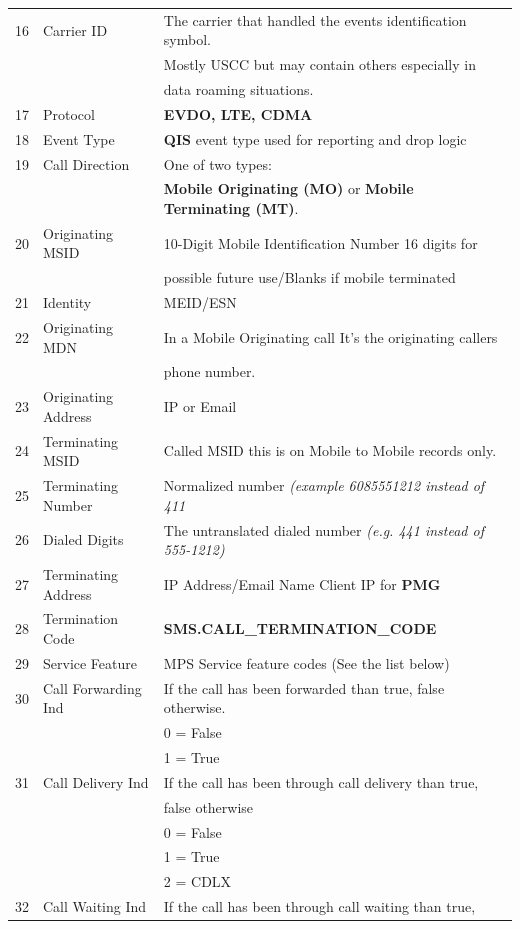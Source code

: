 \documentclass[12pt,twoside]{article}
\begin{document}
\begin{longtable}{c|l|l}
16 & Carrier ID & The carrier that handled the events identification symbol.\\
 &  & Mostly USCC but may contain others especially in\\
 &  & data roaming situations.\\
17 & Protocol & \textbf{EVDO, LTE, CDMA}\\
18 & Event Type & \textbf{QIS} event type used for reporting and drop logic\\
19 & Call Direction & One of two types:\\
 &  & \textbf{Mobile Originating (MO)} or \textbf{Mobile Terminating (MT)}.\\
20 & Originating MSID & 10-Digit Mobile Identification Number 16 digits for\\
 &  & possible future use/Blanks if mobile terminated\\
21 & Identity & MEID/ESN\\
22 & Originating MDN & In a Mobile Originating call It's the originating callers\\
 &  & phone number.\\
23 & Originating Address & IP or Email\\
24 & Terminating MSID & Called MSID this is on Mobile to Mobile records only.\\
25 & Terminating Number & Normalized number \emph{(example 6085551212 instead of 411}\\
26 & Dialed Digits & The untranslated dialed number \emph{(e.g. 441 instead of 555-1212)}\\
27 & Terminating Address & IP Address/Email Name Client IP for \textbf{PMG}\\
28 & Termination Code & \textbf{SMS.CALL\_TERMINATION\_CODE}\\
29 & Service Feature & MPS Service feature codes (See the list below)\\
30 & Call Forwarding Ind & If the call has been forwarded than true, false otherwise.\\
 &  & 0 = False\\
 &  & 1 = True\\
31 & Call Delivery Ind & If the call has been through call delivery than true,\\
 &  & false otherwise\\
 &  & 0 = False\\
 &  & 1 = True\\
 &  & 2 = CDLX\\
32 & Call Waiting Ind & If the call has been through call waiting than true,\\

\end{longtable}
\end{document}
